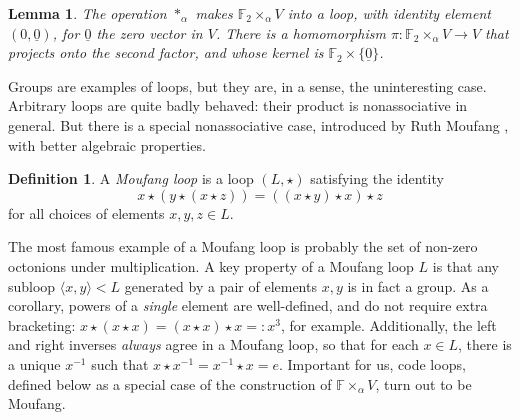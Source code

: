\documentclass{article}
\theoremstyle{plain}
\newtheorem{lemma}{Lemma}
\theoremstyle{definition}
\newtheorem*{definition}{Definition}
\def \FF {\mathbb{F}}
\begin{document}
\begin{lemma}
The operation $\ast_\alpha$ makes $\FF_2\times_\alpha V$ into a loop, with identity element $(0,\underline{0})$, for $\underline{0}$ the zero vector in $V$.
There is a homomorphism $\pi\colon \FF_2\times_\alpha V \to V$ that projects onto the second factor, and whose kernel is $\FF_2 \times\{\underline{0}\}$.
\end{lemma}

Groups are examples of loops, but they are, in a sense, the uninteresting case. 
Arbitrary loops are quite badly behaved: their product is nonassociative in general. 
But there is a special nonassociative case, introduced by Ruth Moufang \cite{Moufang}, with better algebraic properties.

\begin{definition}
A \emph{Moufang loop} is a loop $(L,\star)$ satisfying the identity
\[
x \star (y \star (x \star z)) = ((x \star y) \star x) \star z
\]
for all choices of elements $x,y,z\in L$.
\end{definition}

The most famous example of a Moufang loop is probably the set of non-zero octonions under multiplication. 
A key property of a Moufang loop $L$ is that any subloop $\langle x,y\rangle < L$ generated by a pair of elements $x,y$ is in fact a group. 
As a corollary, powers of a \emph{single} element are well-defined, and do not require extra bracketing: $x\star (x \star x) = (x\star x) \star x =: x^3$, for example. 
Additionally, the left and right inverses \emph{always} agree in a Moufang loop, so that for each $x\in L$, there is a unique $x^{-1}$ such that $x\star x^{-1} = x^{-1}\star x = e$. 
Important for us, code loops, defined below as a special case of the construction of $\FF\times_\alpha V$, turn out to be Moufang.
\end{document}
